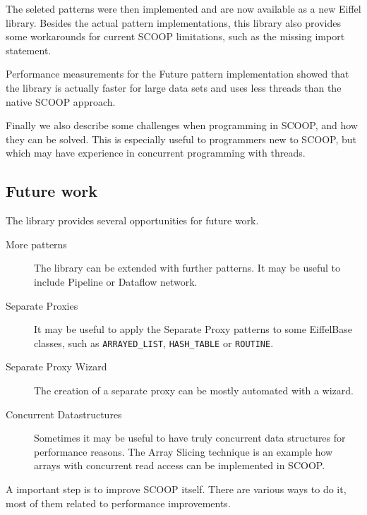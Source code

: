 \documentclass[a4paper,10pt]{article}
\begin{document}
The seleted patterns were then implemented and are now available as a new Eiffel library.
Besides the actual pattern implementations, this library also provides some workarounds for current SCOOP limitations, such as the missing import statement.

Performance measurements for the Future pattern implementation showed that the library is actually faster for large data sets and uses less threads than the native SCOOP approach.

Finally we also describe some challenges when programming in SCOOP, and how they can be solved.
This is especially useful to programmers new to SCOOP, but which may have experience in concurrent programming with threads.

\subsection{Future work}

The library provides several opportunities for future work.

\begin{description}
 \item [More patterns] The library can be extended with further patterns.
 It may be useful to include Pipeline or Dataflow network.
 \item [Separate Proxies] It may be useful to apply the Separate Proxy patterns to some EiffelBase classes, such as \lstinline!ARRAYED_LIST!, \lstinline!HASH_TABLE! or \lstinline!ROUTINE!.
 \item [Separate Proxy Wizard] The creation of a separate proxy can be mostly automated with a wizard.
 \item [Concurrent Datastructures] Sometimes it may be useful to have truly concurrent data structures for performance reasons.
The Array Slicing technique \cite{paper:array-slicing} is an example how arrays with concurrent read access can be implemented in SCOOP.
\end{description}

A important step is to improve SCOOP itself.
There are various ways to do it, most of them related to performance improvements.
\end{document}
